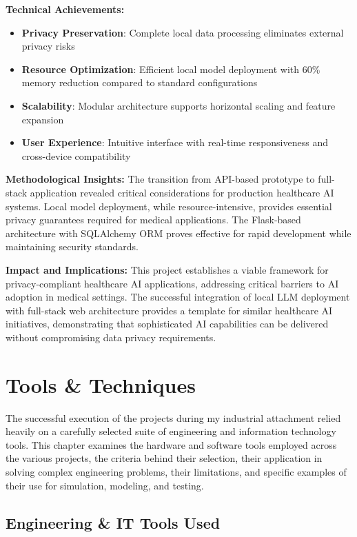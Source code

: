 \documentclass[12pt,a4paper]{article}
\begin{document}
\textbf{Technical Achievements:}
\begin{itemize}
    \item \textbf{Privacy Preservation}: Complete local data processing eliminates external privacy risks
    \item \textbf{Resource Optimization}: Efficient local model deployment with 60\% memory reduction compared to standard configurations
    \item \textbf{Scalability}: Modular architecture supports horizontal scaling and feature expansion
    \item \textbf{User Experience}: Intuitive interface with real-time responsiveness and cross-device compatibility
\end{itemize}

\textbf{Methodological Insights:}
The transition from API-based prototype to full-stack application revealed critical considerations for production healthcare AI systems. Local model deployment, while resource-intensive, provides essential privacy guarantees required for medical applications. The Flask-based architecture with SQLAlchemy ORM proves effective for rapid development while maintaining security standards.

\textbf{Impact and Implications:}
This project establishes a viable framework for privacy-compliant healthcare AI applications, addressing critical barriers to AI adoption in medical settings. The successful integration of local LLM deployment with full-stack web architecture provides a template for similar healthcare AI initiatives, demonstrating that sophisticated AI capabilities can be delivered without compromising data privacy requirements.



\newpage
\section{Tools \& Techniques}

The successful execution of the projects during my industrial attachment relied heavily on a carefully selected suite of engineering and information technology tools. This chapter examines the hardware and software tools employed across the various projects, the criteria behind their selection, their application in solving complex engineering problems, their limitations, and specific examples of their use for simulation, modeling, and testing.

\subsection{Engineering \& IT Tools Used}
\end{document}
